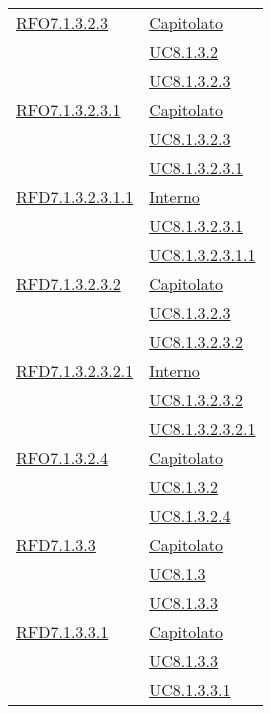 \begin{longtable}{|>{\centering}m{5cm}|m{5cm}<{\centering}|}
\hyperlink{RFO7.1.3.2.3}{RFO7.1.3.2.3} & \hyperlink{Capitolato}{Capitolato}\\
& \hyperref[UC8.1.3.2]{UC8.1.3.2}\\
& \hyperref[UC8.1.3.2.3]{UC8.1.3.2.3}\\ \hline

\hyperlink{RFO7.1.3.2.3.1}{RFO7.1.3.2.3.1} & \hyperlink{Capitolato}{Capitolato}\\
& \hyperref[UC8.1.3.2.3]{UC8.1.3.2.3}\\
& \hyperref[UC8.1.3.2.3.1]{UC8.1.3.2.3.1}\\ \hline

\hyperlink{RFD7.1.3.2.3.1.1}{RFD7.1.3.2.3.1.1} & \hyperlink{Interno}{Interno}\\
& \hyperref[UC8.1.3.2.3.1]{UC8.1.3.2.3.1}\\
& \hyperref[UC8.1.3.2.3.1.1]{UC8.1.3.2.3.1.1}\\ \hline

\hyperlink{RFD7.1.3.2.3.2}{RFD7.1.3.2.3.2} & \hyperlink{Capitolato}{Capitolato}\\
& \hyperref[UC8.1.3.2.3]{UC8.1.3.2.3}\\
& \hyperref[UC8.1.3.2.3.2]{UC8.1.3.2.3.2}\\ \hline

\hyperlink{RFD7.1.3.2.3.2.1}{RFD7.1.3.2.3.2.1} & \hyperlink{Interno}{Interno}\\
& \hyperref[UC8.1.3.2.3.2]{UC8.1.3.2.3.2}\\
& \hyperref[UC8.1.3.2.3.2.1]{UC8.1.3.2.3.2.1}\\ \hline

\hyperlink{RFO7.1.3.2.4}{RFO7.1.3.2.4} & \hyperlink{Capitolato}{Capitolato}\\
& \hyperref[UC8.1.3.2]{UC8.1.3.2}\\
& \hyperref[UC8.1.3.2.4]{UC8.1.3.2.4}\\ \hline

\hyperlink{RFD7.1.3.3}{RFD7.1.3.3} & \hyperlink{Capitolato}{Capitolato}\\
& \hyperref[UC8.1.3]{UC8.1.3}\\
& \hyperref[UC8.1.3.3]{UC8.1.3.3}\\ \hline

\hyperlink{RFD7.1.3.3.1}{RFD7.1.3.3.1} & \hyperlink{Capitolato}{Capitolato}\\
& \hyperref[UC8.1.3.3]{UC8.1.3.3}\\
& \hyperref[UC8.1.3.3.1]{UC8.1.3.3.1}\\ \hline


\end{longtable}
